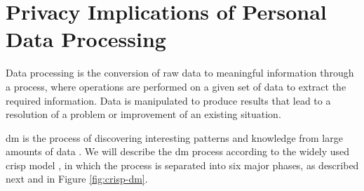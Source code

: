
\section{Privacy Implications of Personal Data Processing} 
\label{sec:PrivacyImplicationsPersonalDataProcessing}


Data processing is the conversion of raw data to meaningful information through a process, where operations are performed on a given set of data to extract the required information. Data is manipulated to produce results that lead to a resolution of a problem or improvement of an existing situation. 

\ac{dm} is the process of discovering interesting patterns and knowledge from large amounts of data \cite{han2011data}. We will describe the \ac{dm} process according to the widely used \ac{crisp} model \cite{wirth2000crisp}, in which the process is separated into six major phases, as described next and in Figure \ref{fig:crisp-dm}.

